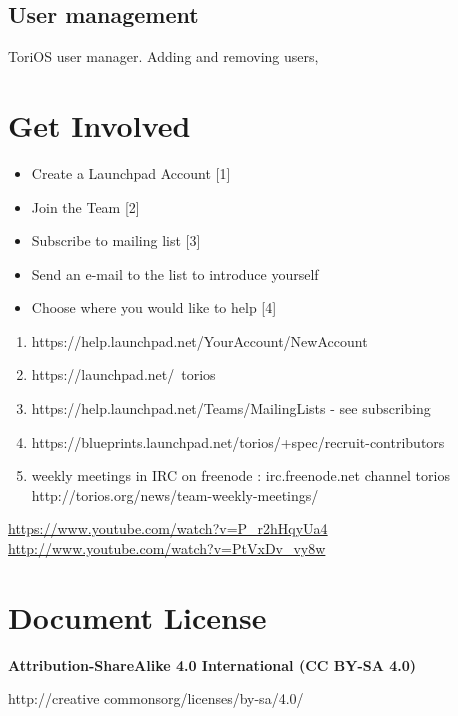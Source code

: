 \documentclass[12pt,a4paper]{book}
\begin{document}
\section{User management}

ToriOS user manager.  Adding and removing users, 

\newpage


\chapter{Get Involved}

\begin{itemize}
\item{Create a Launchpad Account [1]}
\item{Join the Team [2]}
\item{Subscribe to mailing list [3]}
\item{Send an e-mail to the list to introduce yourself}
\item{Choose where you would like to help [4]}
\end{itemize}


\begin{enumerate}
\item {https://help.launchpad.net/YourAccount/NewAccount}
\item {https://launchpad.net/~torios}
\item {https://help.launchpad.net/Teams/MailingLists - see subscribing}
\item{https://blueprints.launchpad.net/torios/+spec/recruit-contributors}
\item{weekly meetings in IRC on freenode : irc.freenode.net  channel torios http://torios.org/news/team-weekly-meetings/ }

\end{enumerate}

\url{https://www.youtube.com/watch?v=P_r2hHqyUa4} \\
\url{http://www.youtube.com/watch?v=PtVxDv_vy8w} \\





\chapter{Document License}
\textbf{Attribution-ShareAlike 4.0 International (CC BY-SA 4.0)}

http://creative commonsorg/licenses/by-sa/4.0/
\end{document}
